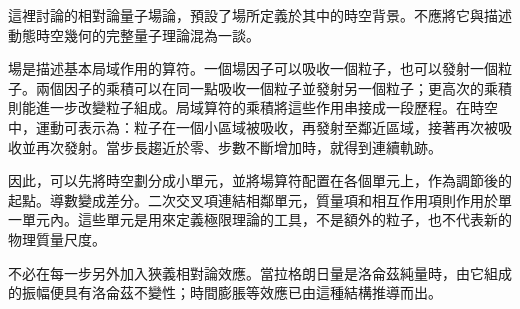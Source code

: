\begin{classroomqa}
\end{classroomqa}

這裡討論的相對論量子場論，預設了場所定義於其中的時空背景。不應將它與描述動態時空幾何的完整量子理論混為一談。

\begin{classroomqa}
\end{classroomqa}

場是描述基本局域作用的算符。一個場因子可以吸收一個粒子，也可以發射一個粒子。兩個因子的乘積可以在同一點吸收一個粒子並發射另一個粒子；更高次的乘積則能進一步改變粒子組成。局域算符的乘積將這些作用串接成一段歷程。在時空中，運動可表示為：粒子在一個小區域被吸收，再發射至鄰近區域，接著再次被吸收並再次發射。當步長趨近於零、步數不斷增加時，就得到連續軌跡。

\begin{classroomqa}
\end{classroomqa}

因此，可以先將時空劃分成小單元，並將場算符配置在各個單元上，作為調節後的起點。導數變成差分。二次交叉項連結相鄰單元，質量項和相互作用項則作用於單一單元內。這些單元是用來定義極限理論的工具，不是額外的粒子，也不代表新的物理質量尺度。

不必在每一步另外加入狹義相對論效應。當拉格朗日量是洛侖茲純量時，由它組成的振幅便具有洛侖茲不變性；時間膨脹等效應已由這種結構推導而出。

\begin{classroomqa}
\end{classroomqa}

